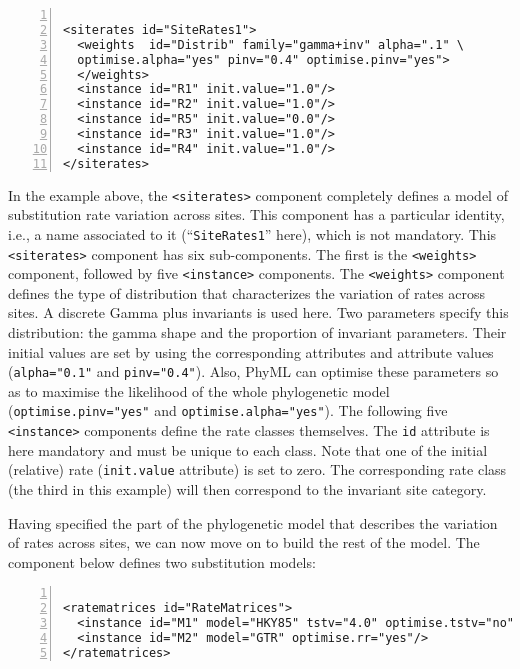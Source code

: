 \documentclass[a4paper,12pt]{article}
\newcommand{\x}[1]{\texttt{#1}}
\begin{document}
\vspace{0.2cm}
\begin{Verbatim}[frame=single, label=$\Gamma4$+I rates, samepage=true, baselinestretch=0.5,
  fontsize=\small, numbers=left]

<siterates id="SiteRates1">
  <weights  id="Distrib" family="gamma+inv" alpha=".1" \
  optimise.alpha="yes" pinv="0.4" optimise.pinv="yes">
  </weights>
  <instance id="R1" init.value="1.0"/>
  <instance id="R2" init.value="1.0"/>
  <instance id="R5" init.value="0.0"/>
  <instance id="R3" init.value="1.0"/>
  <instance id="R4" init.value="1.0"/>
</siterates>

\end{Verbatim}

In the example above, the \x{<siterates>} component  completely defines a model of substitution rate
variation across  sites. This component  has a  particular identity, i.e.,  a name associated  to it
(``\x{SiteRates1}''  here),  which  is  not  mandatory.   This  \x{<siterates>}  component  has  six
sub-components.   The  first  is  the  \x{<weights>}  component,  followed  by  five  \x{<instance>}
components. The  \x{<weights>} component  defines the  type of  distribution that  characterizes the
variation of  rates across sites.  A discrete  Gamma plus invariants  is used here.   Two parameters
specify this distribution: the gamma shape and the proportion of invariant parameters. Their initial
values  are set  by using  the corresponding  attributes and  attribute values  (\x{alpha="0.1"} and
\x{pinv="0.4"}). Also, PhyML can  optimise these parameters so as to maximise  the likelihood of the
whole phylogenetic model (\x{optimise.pinv="yes"}  and \x{optimise.alpha="yes"}). The following five
\x{<instance>}  components  define  the  rate  classes themselves.  The  \x{id}  attribute  is  here
mandatory  and must  be  unique  to each  class.   Note  that one  of  the  initial (relative)  rate
(\x{init.value} attribute) is set to zero. The  corresponding rate class (the third in this example)
will then correspond to the invariant site category.

Having specified the  part of the phylogenetic  model that describes the variation  of rates across
sites,  we can  now move  on  to build  the rest  of the  model.   The component  below defines  two
substitution models:

\vspace{0.2cm}
\begin{Verbatim}[frame=single, label=Rate matrices, samepage=true, baselinestretch=0.5,
  fontsize=\small, numbers=left]

<ratematrices id="RateMatrices">
  <instance id="M1" model="HKY85" tstv="4.0" optimise.tstv="no"/>
  <instance id="M2" model="GTR" optimise.rr="yes"/>
</ratematrices>
\end{Verbatim}
\end{document}
